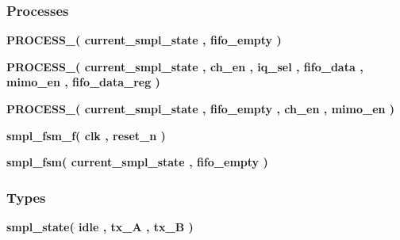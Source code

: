 \subsubsection*{Processes}
 \begin{DoxyCompactItemize}
\item 
{\bf P\+R\+O\+C\+E\+S\+S\+\_}{\bfseries  ( {\bfseries {\bfseries {\bf current\+\_\+smpl\+\_\+state}} \textcolor{vhdlchar}{ }} , {\bfseries {\bfseries {\bf fifo\+\_\+empty}} \textcolor{vhdlchar}{ }} )}
\item 
{\bf P\+R\+O\+C\+E\+S\+S\+\_}{\bfseries  ( {\bfseries {\bfseries {\bf current\+\_\+smpl\+\_\+state}} \textcolor{vhdlchar}{ }} , {\bfseries {\bfseries {\bf ch\+\_\+en}} \textcolor{vhdlchar}{ }} , {\bfseries {\bfseries {\bf iq\+\_\+sel}} \textcolor{vhdlchar}{ }} , {\bfseries {\bfseries {\bf fifo\+\_\+data}} \textcolor{vhdlchar}{ }} , {\bfseries {\bfseries {\bf mimo\+\_\+en}} \textcolor{vhdlchar}{ }} , {\bfseries {\bfseries {\bf fifo\+\_\+data\+\_\+reg}} \textcolor{vhdlchar}{ }} )}
\item 
{\bf P\+R\+O\+C\+E\+S\+S\+\_}{\bfseries  ( {\bfseries {\bfseries {\bf current\+\_\+smpl\+\_\+state}} \textcolor{vhdlchar}{ }} , {\bfseries {\bfseries {\bf fifo\+\_\+empty}} \textcolor{vhdlchar}{ }} , {\bfseries {\bfseries {\bf ch\+\_\+en}} \textcolor{vhdlchar}{ }} , {\bfseries {\bfseries {\bf mimo\+\_\+en}} \textcolor{vhdlchar}{ }} )}
\item 
{\bf smpl\+\_\+fsm\+\_\+f}{\bfseries  ( {\bfseries {\bfseries {\bf clk}} \textcolor{vhdlchar}{ }} , {\bfseries {\bfseries {\bf reset\+\_\+n}} \textcolor{vhdlchar}{ }} )}
\item 
{\bf smpl\+\_\+fsm}{\bfseries  ( {\bfseries {\bfseries {\bf current\+\_\+smpl\+\_\+state}} \textcolor{vhdlchar}{ }} , {\bfseries {\bfseries {\bf fifo\+\_\+empty}} \textcolor{vhdlchar}{ }} )}
\end{DoxyCompactItemize}
\subsubsection*{Types}
 \begin{DoxyCompactItemize}
\item 
{\bfseries {\bf smpl\+\_\+state}{\bfseries \textcolor{vhdlchar}{(}\textcolor{vhdlchar}{ }\textcolor{vhdlchar}{idle}\textcolor{vhdlchar}{ }\textcolor{vhdlchar}{,}\textcolor{vhdlchar}{ }\textcolor{vhdlchar}{tx\+\_\+A}\textcolor{vhdlchar}{ }\textcolor{vhdlchar}{,}\textcolor{vhdlchar}{ }\textcolor{vhdlchar}{tx\+\_\+B}\textcolor{vhdlchar}{ }\textcolor{vhdlchar}{)}\textcolor{vhdlchar}{ }}} 
\end{DoxyCompactItemize}
